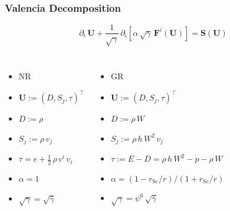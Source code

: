 \documentclass{beamer}
\newcommand{\p}{\partial}
\newcommand{\bs}{\boldsymbol}
\newcommand{\rsc}{r_{\mathrm{Sc}}}
\begin{document}
\begin{frame}
\frametitle{Valencia Decomposition}

  \begin{equation*}
    \p_{t}\,\bs{U}
    +\frac{1}{\sqrt{\gamma}}\,
    \p_{i}\left[\alpha\,\sqrt{\gamma}\,\bs{F}^{i}\left(\bs{U}\right)\right]
    =\bs{S}\left(\bs{U}\right)
  \end{equation*}

  \begin{columns}[c]


      \begin{itemize}[<+->]
        \item[]
          NR
        \item[]
          $\bs{U}:=\left(D,S_{j},\tau\right)^{\top}$
        \item[]
          $D:=\rho$
        \item[]
          $S_{j}:=\rho\,v_{j}$
        \item[]
          $\tau=e+\frac{1}{2}\,\rho\,v^{i}\,v_{i}$
        \item[]
          $\alpha=1$
        \item[]
          $\sqrt{\gamma}=\sqrt{\bar{\gamma}}$
      \end{itemize}


      \begin{itemize}[<+->]
        \item[]
          GR
        \item[]
          $\bs{U}:=\left(D,S_{j},\tau\right)^{\top}$
        \item[]
          $D:=\rho\,W$
        \item[]
          $S_{j}:=\rho\,h\,W^{2}\,v_{j}$
        \item[]
          $\tau:=E-D=\rho\,h\,W^{2}-p-\rho\,W$
        \item[]
          $\alpha=\left(1-\rsc/r\right)/\left(1+\rsc/r\right)$
        \item[]
          $\sqrt{\gamma}=\psi^{6}\,\sqrt{\bar{\gamma}}$
      \end{itemize}

  \end{columns}

\end{frame}
\end{document}
